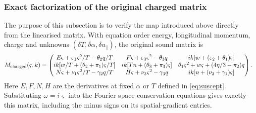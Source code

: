 \subsubsection*{Exact factorization of the original charged matrix}
The purpose of this subsection is to verify the map introduced above directly from the linearised matrix. With equation order energy, longitudinal momentum, charge and
unknowns $(\delta T,\delta\alpha,\delta u_\parallel)$, the original sound matrix is
\begingroup\small
\begin{equation}\label{app:original-charged-matrix}
M_{\rm charged}(\varsigma,k)=
\begin{pmatrix}
 E\varsigma+\varepsilon_1\varsigma^2/T-\theta_2q/T&
 F\varsigma+\varepsilon_3\varsigma^2-\theta_3q&ik[w+(\varepsilon_2+\theta_1)\varsigma]\\
 ik[w/T+(\theta_2+\pi_1)\varsigma/T]&
 ik[Tn+(\theta_3+\pi_3)\varsigma]&\theta_1\varsigma^2+w\varsigma+(4\eta/3-\pi_2)q\\
 N\varsigma+\nu_1\varsigma^2/T-\gamma_2q/T&
 H\varsigma+\nu_3\varsigma^2-\gamma_3q&ik[n+(\nu_2+\gamma_1)\varsigma]
\end{pmatrix}.
\end{equation}
\endgroup
Here $E,F,N,H$ are the derivatives at fixed $\alpha$ or $T$ defined
in \eqref{eq:suscept}. Substituting $\omega=i\varsigma$ into the Fourier space
conservation equations gives exactly this matrix, including the minus
signs on its spatial-gradient entries.

